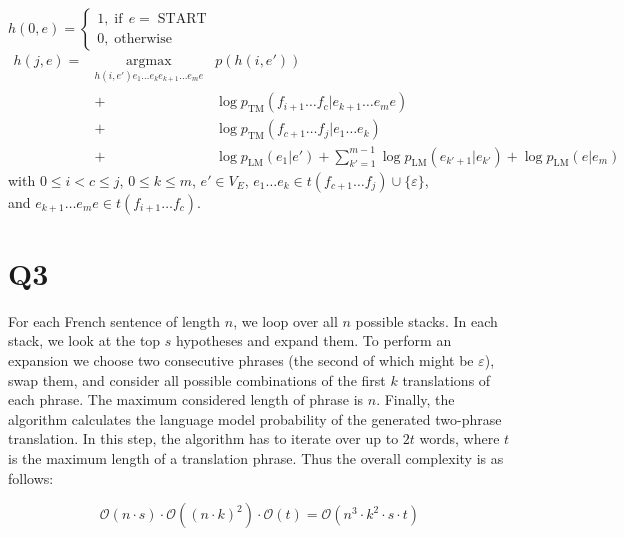 \documentclass[11pt]{article}
\newcommand{\nocomma}{}
\newcommand{\noplus}{}
\newcommand{\tmop}[1]{\ensuremath{\operatorname{#1}}}
\newcommand{\upl}{+}
\begin{document}
$h (0 \nocomma, e) = \left\{ \begin{array}{l}
1 \nocomma, \tmop{if} \, e = \tmop{START}\\
0 \nocomma, \tmop{otherwise}
\end{array} \right.$
\begin{eqnarray}
h (j, e) = & \underset{h (i, e') e_1 \ldots e_k e_{k + 1} \ldots e_m
	e}{\tmop{argmax}}_{} & p (h (i, e')) \nonumber\\
& + & \log p_{\tmop{TM}} (f_{i + 1} \ldots f_c |e_{k + 1} \ldots e_m e)
\nonumber\\
& \noplus + & \log p_{\tmop{TM}} (f_{c + 1} \ldots f_j |e_1 \ldots e_k)
\nonumber\\
& \upl & \log p_{\tmop{LM}} (e_1 |e') + \sum_{k' = 1}^{m - 1} \log
p_{\tmop{LM}} (e_{k' + 1} |e_{k'}) + \log p_{\tmop{LM}} (e|e_m) \nonumber
\end{eqnarray}
with $0 \leq i < c \leq j$, $0 \leq k \leq m$, $e' \in V_E$, $e_1 \ldots e_k
\in t (f_{c + 1} \ldots f_j) \cup \{ \varepsilon \}$,\\
and $e_{k + 1} \ldots e_m e \in t (f_{i + 1} \ldots f_c)$.



\section*{Q3}
For each French sentence of length $n$, we loop over all $n$ possible stacks. In each stack, we look at the top $s$ hypotheses and expand them. To perform an expansion we choose two consecutive phrases (the second of which might be $\varepsilon$), swap them, and consider all possible combinations of the first $k$ translations of each phrase. The maximum considered length of phrase is $n$. Finally, the algorithm calculates the language model probability of the generated two-phrase translation. In this step, the algorithm has to iterate over up to $2 t$ words, where $t$ is the maximum length of a translation phrase. Thus the overall complexity is as follows:

\[
\mathcal{O}(n \cdot s) \cdot \mathcal{O}({(n \cdot k)}^2)
\cdot \mathcal{O}(t)
= \mathcal{O}(n^3 \cdot k^2 \cdot s \cdot t)
\]

\end{document}
